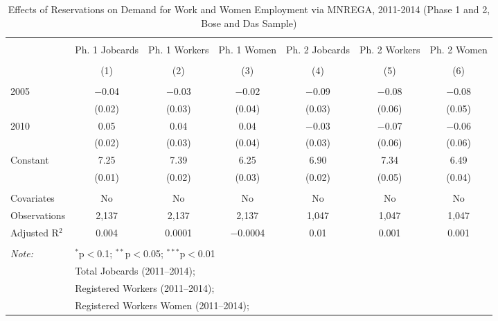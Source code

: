
\begin{sidewaystable}[!htbp] \centering 
  \caption{Effects of Reservations on Demand for Work and Women Employment via MNREGA, 2011-2014 (Phase 1 and 2, Bose and Das Sample)} 
  \label{mnrega_main_up_bd} 
\scriptsize 
\begin{tabular}{@{\extracolsep{0pt}}lcccccc} 
\\[-1.8ex]\hline 
\hline \\[-1.8ex] 
 & Ph. 1 Jobcards & Ph. 1 Workers & Ph. 1 Women & Ph. 2 Jobcards & Ph. 2 Workers & Ph. 2 Women \\ 
\\[-1.8ex] & (1) & (2) & (3) & (4) & (5) & (6)\\ 
\hline \\[-1.8ex] 
 2005 & $-$0.04 & $-$0.03 & $-$0.02 & $-$0.09 & $-$0.08 & $-$0.08 \\ 
  & (0.02) & (0.03) & (0.04) & (0.03) & (0.06) & (0.05) \\ 
  2010 & 0.05 & 0.04 & 0.04 & $-$0.03 & $-$0.07 & $-$0.06 \\ 
  & (0.02) & (0.03) & (0.04) & (0.03) & (0.06) & (0.06) \\ 
  Constant & 7.25 & 7.39 & 6.25 & 6.90 & 7.34 & 6.49 \\ 
  & (0.01) & (0.02) & (0.03) & (0.02) & (0.05) & (0.04) \\ 
 \hline \\[-1.8ex] 
Covariates & No & No & No & No & No & No \\ 
Observations & 2,137 & 2,137 & 2,137 & 1,047 & 1,047 & 1,047 \\ 
Adjusted R$^{2}$ & 0.004 & 0.0001 & $-$0.0004 & 0.01 & 0.001 & 0.001 \\ 
\hline 
\hline \\[-1.8ex] 
\textit{Note:}  & \multicolumn{6}{l}{$^{*}$p$<$0.1; $^{**}$p$<$0.05; $^{***}$p$<$0.01} \\ 
 & \multicolumn{6}{l}{Total Jobcards (2011--2014);} \\ 
 & \multicolumn{6}{l}{Registered Workers (2011--2014);} \\ 
 & \multicolumn{6}{l}{Registered Workers Women  (2011--2014);} \\ 
\end{tabular} 
\end{sidewaystable} 
